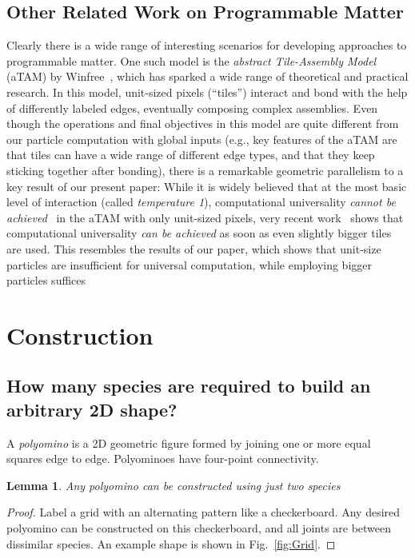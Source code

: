 \documentclass[letterpaper, 10 pt, conference]{ieeeconf}
\newtheorem{lemma}[theorem]{Lemma}
\begin{document}
\subsection{Other Related Work on Programmable Matter}
Clearly there is a wide range of interesting scenarios for developing approaches to programmable matter.
One such model is the \emph{abstract Tile-Assembly Model} (aTAM) by Winfree~\cite{Winf98,WLWS98,LaWiRe99}, which has 
sparked a wide range of theoretical and practical research. In this model, unit-sized pixels (``tiles'')
interact and bond with the help of differently labeled edges, eventually composing complex assemblies.
Even though the operations and final objectives in this model are quite different from our particle computation with global
inputs (e.g., key features of the aTAM are that tiles can have a wide range of different edge types, and
that they keep sticking together after bonding), there is
a remarkable geometric parallelism to a key result of our present paper:
While it is widely believed that at the most basic level of interaction (called {\em temperature 1}),
computational universality {\em cannot be achieved}~\cite{LSAT1,ManuchTemp1,IUNeedsCoop} in the aTAM with only unit-sized pixels, 
very recent work~\cite{fhp+-ucapt-15} shows that computational universality {\em can be achieved} as soon as even slightly bigger tiles are used. 
This resembles the results of our paper, which shows that unit-size particles are insufficient for universal computation, while employing bigger particles suffices


\section{Construction}\label{sec:Construction}


\subsection{How many species are required to build an arbitrary 2D shape?}\label{subsec:RobotSpecies}
A \emph{polyomino} is a 2D geometric figure formed by joining one or more equal squares edge to edge. Polyominoes have four-point connectivity.


\begin{lemma}
  Any polyomino can be constructed using just two species
  \end{lemma}
\begin{proof} 
Label a grid with an alternating pattern like a checkerboard.  Any desired polyomino can be constructed on this checkerboard, and all joints are between dissimilar species.
  An example shape is shown in Fig.~\ref{fig:Grid}.
  \end{proof}
  
\end{document}
